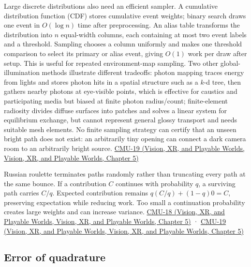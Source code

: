 Large discrete distributions also need an efficient sampler. A cumulative distribution function (CDF) stores cumulative event weights; binary search draws one event in \(O(\log n)\) time after preprocessing. An alias table transforms the distribution into \(n\) equal-width columns, each containing at most two event labels and a threshold. Sampling chooses a column uniformly and makes one threshold comparison to select its primary or alias event, giving \(O(1)\) work per draw after setup. This is useful for repeated environment-map sampling. Two other global-illumination methods illustrate different tradeoffs: photon mapping traces energy from lights and stores photon hits in a spatial structure such as a \(k\)-d tree, then gathers nearby photons at eye-visible points, which is effective for caustics and participating media but biased at finite photon radius/count; finite-element radiosity divides diffuse surfaces into patches and solves a linear system for equilibrium exchange, but cannot represent general glossy transport and needs suitable mesh elements. No finite sampling strategy can certify that an unseen bright path does not exist: an arbitrarily tiny opening can connect a dark camera room to an arbitrarily bright source. \href{../07-Vision-XR-and-Playable-Worlds/main.pdf\#nameddest=04-visual-computing-ii-ch036-cmu-19---variance-reduction}{CMU-19 (Vision, XR, and Playable Worlds, Vision, XR, and Playable Worlds, Chapter 5)}

Russian roulette terminates paths randomly rather than truncating every path at the same bounce. If a contribution \(C\) continues with probability \(q\), a surviving path carries \(C/q\). Expected contribution remains \(q(C/q)+(1-q)0=C\), preserving expectation while reducing work. Too small a continuation probability creates large weights and can increase variance. \href{../07-Vision-XR-and-Playable-Worlds/main.pdf\#nameddest=04-visual-computing-ii-ch036-cmu-18---monte-carlo-rendering}{CMU-18 (Vision, XR, and Playable Worlds, Vision, XR, and Playable Worlds, Chapter 5)} · \href{../07-Vision-XR-and-Playable-Worlds/main.pdf\#nameddest=04-visual-computing-ii-ch036-cmu-19---variance-reduction}{CMU-19 (Vision, XR, and Playable Worlds, Vision, XR, and Playable Worlds, Chapter 5)}

\subsection{Error of quadrature}\label{03-visual-computing-i-ch012-error-of-quadrature}

